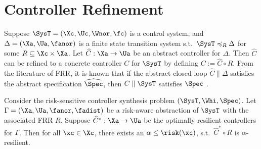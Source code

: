 \section{Controller Refinement}

Suppose $\SysT=(\Xc,\Uc,\Wnor,\fc)$ is a control system, and $\Delta=(\Xa,\Ua,\fanor)$ is a finite state transition system s.t.\ $\SysT\preccurlyeq_R \Delta$ for some $R\subseteq \Xc\times \Xa$.
Let $\widehat{C}:\Xa\rightarrow \Ua$ be an abstract controller for $\Delta$.
Then $\widehat{C}$ can be refined to a concrete controller $C$ for $\SysT$ by defining $C:= \widehat{C}\circ R$.
From the literature of FRR, it is known that if the abstract closed loop $\widehat{C}\parallel \Delta$ satisfies the abstract specification $\widehat{\Spec}$, then $C\parallel \SysT$ satisfies $\Spec$ \cite{reissig2016feedback}.




\begin{theorem}
	Consider the risk-sensitive controller synthesis problem $(\SysT, \Whi, \Spec)$.
	Let $\Gamma = (\Xa,\Ua,\fanor,\fadist)$ be a risk-aware abstraction of $\SysT$ with the associated FRR $R$.
	Suppose $\widehat{C}^*:\Xa\rightarrow \Ua$ be the optimally resilient controllers for $\Gamma$.
	Then for all $\xc\in \Xc$, there exists an $\alpha\leq \risk(\xc)$, s.t.\ $\widehat{C}^*\circ R$ is $\alpha$-resilient.
\end{theorem}

